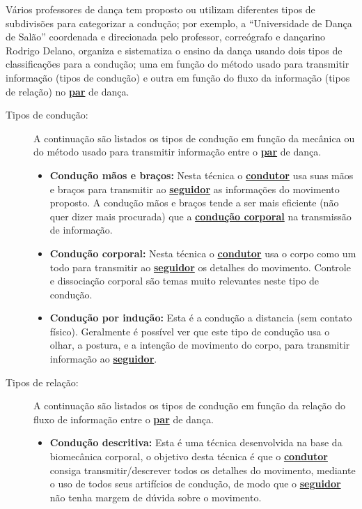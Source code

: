 Vários professores de dança tem proposto ou utilizam diferentes tipos de subdivisões para categorizar
a condução; por exemplo, a ``Universidade de Dança de Salão'' 
coordenada e direcionada pelo professor, correógrafo e dançarino Rodrigo Delano,
organiza e sistematiza o ensino da dança usando dois tipos de 
classificações para a condução;
uma em função do método usado para transmitir informação (tipos de condução) e outra em 
função do fluxo da informação (tipos de relação) no \hyperref[def:Par]{\textbf{par}} de dança.  
\begin{description} 
\item [Tipos de condução:]  A continuação são listados os tipos de condução em função da mecânica 
ou do método usado para transmitir informação entre o 
\hyperref[def:Par]{\textbf{par}} de dança. 
\begin{itemize}
    \item \textbf{Condução mãos e braços:} 
    Nesta técnica o \hyperref[def:Condutor]{\textbf{condutor}} 
    usa suas mãos e braços para transmitir 
    ao \hyperref[def:Seguidor]{\textbf{seguidor}} 
    as informações do movimento proposto.
    A condução mãos e braços tende a ser mais eficiente (não quer dizer mais procurada) 
    que a \hyperref[ref:conducaocorporal]{\textbf{condução corporal}}
    na transmissão de informação.
    \item \textbf{Condução corporal:}\label{ref:conducaocorporal}
    Nesta técnica o \hyperref[def:Condutor]{\textbf{condutor}} usa o 
    corpo como um todo para transmitir ao \hyperref[def:Seguidor]{\textbf{seguidor}}
    os detalhes do movimento. 
    Controle e dissociação corporal são temas muito relevantes neste tipo de condução.
    \item \textbf{Condução por indução:} Esta é a condução a distancia 
    (sem contato físico).
    Geralmente é possível ver que este tipo de condução usa o olhar, a postura, 
    e a intenção de movimento do corpo, 
    para transmitir informação ao \hyperref[def:Seguidor]{\textbf{seguidor}}.
\end{itemize}
\item [Tipos de relação:] A continuação são listados 
os tipos de condução em função da relação do fluxo de informação
entre o \hyperref[def:Par]{\textbf{par}} de dança.
\begin{itemize}
    \item \textbf{Condução descritiva:} 
    Esta é uma técnica desenvolvida na base da biomecânica corporal,
    o objetivo desta técnica é que o 
    \hyperref[def:Condutor]{\textbf{condutor}} consiga transmitir/descrever 
    todos os detalhes do movimento, mediante o uso de todos seus artifícios de condução,
    de modo que o \hyperref[def:Seguidor]{\textbf{seguidor}} 
    não tenha margem de dúvida sobre o movimento.


\end{itemize}
\end{description}
